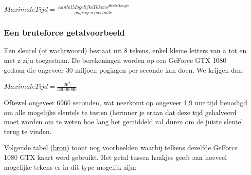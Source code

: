\documentclass[
  10pt,
  dutch,
  paper=a4,
  ,captions=tableheading
]{scrbook}
\begin{document}
\(MaximaleTijd = \frac{AantalMogelijkeTekens^{SleutelLengte}}{pogingen/seconde}\)

\subsubsection{Een bruteforce
getalvoorbeeld}\label{een-bruteforce-getalvoorbeeld}

Een sleutel (of wachtwoord) bestaat uit 8 tekens, enkel kleine letters
van a tot en met z zijn toegestaan. De berekeningen worden op een
GeForce GTX 1080 gedaan die ongeveer 30 miljoen pogingen per seconde kan
doen. We krijgen dan:

\(MaximaleTijd = \frac{26^{8}}{30000000}\)

Oftewel ongeveer 6960 seconden, wat neerkomt op ongeveer 1,9 uur tijd
benodigd om alle mogelijke sleutels te testen (herinner je eraan dat
deze tijd gehalveerd moet worden om te weten hoe lang het gemiddeld zal
duren om de juiste sleutel terug te vinden.

Volgende tabel
(\href{HTTPS://uwnthesis.wordpress.com/2020/07/01/brute-force-password-how-long-will-it-take-to-brute-force-a-password/}{bron})
toont nog voorbeelden waarbij telkens dezelfde GeForce 1080 GTX kaart
werd gebruikt. Het getal tussen haakjes geeft aan hoeveel mogelijke
tekens er in dit type mogelijk zijn:
\end{document}
